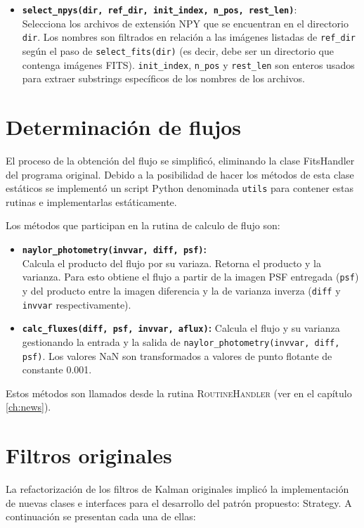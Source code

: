 \begin{itemize}
\item \textbf{\texttt{select\_npys(dir, ref\_dir, init\_index, n\_pos, rest\_len)}}:\\
Selecciona los archivos de extensi\'on NPY que se encuentran en el directorio \texttt{dir}. Los nombres son filtrados en relaci\'on a las im\'agenes listadas de \texttt{ref\_dir} seg\'un el paso de \texttt{select\_fits(dir)} (es decir, debe ser un directorio que contenga im\'agenes FITS). \texttt{init\_index}, \texttt{n\_pos} y \texttt{rest\_len} son enteros usados para extraer substrings espec\'ificos de los nombres de los archivos.
\end{itemize}

\section{Determinaci\'on de flujos}
El proceso de la obtenci\'on del flujo se simplific\'o, eliminando la clase FitsHandler del programa original. Debido a la posibilidad de hacer los m\'etodos de esta clase est\'aticos se implement\'o un script Python denominada \texttt{utils} para contener estas rutinas e implementarlas est\'aticamente.
\bigskip

Los m\'etodos que participan en la rutina de calculo de flujo son: 

\begin{itemize}
\item \textbf{\texttt{naylor\_photometry(invvar, diff, psf)}\cite{naylor}:}\\
Calcula el producto del flujo por su variaza. Retorna el producto y la varianza. Para esto obtiene el flujo a partir de la imagen PSF entregada (\texttt{psf}) y del producto entre la imagen diferencia y la de varianza inverza (\texttt{diff} y \texttt{invvar} respectivamente).
\bigskip


\item \textbf{\texttt{calc\_fluxes(diff, psf, invvar, aflux)}:}
Calcula el flujo y su varianza gestionando la entrada y la salida de \texttt{naylor\_photometry(invvar, diff, psf)}. Los valores NaN son transformados a valores de punto flotante de constante 0.001.
\end{itemize} 

Estos m\'etodos  son llamados desde la rutina \textsc{RoutineHandler} (ver en el cap\'itulo \ref{ch:news}).
\section{Filtros originales}
La refactorizaci\'on de los filtros de Kalman originales implic\'o la implementaci\'on de nuevas clases e interfaces para el desarrollo del patr\'on propuesto: Strategy. A continuaci\'on se presentan cada una de ellas:

